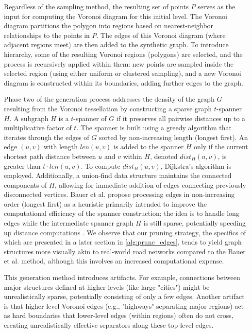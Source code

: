 Regardless of the sampling method, the resulting set of points \(P\) serves as the input for computing the Voronoi diagram for this initial level.
The Voronoi diagram partitions the polygon into regions based on nearest-neighbor relationships to the points in \(P\).
The edges of this Voronoi diagram (where adjacent regions meet) are then added to the synthetic graph.
To introduce hierarchy, some of the resulting Voronoi regions (polygons) are selected, and the process is recursively applied within them: new points are sampled inside the selected region (using either uniform or clustered sampling), and a new Voronoi diagram is constructed within its boundaries, adding further edges to the graph.

Phase two of the generation process addresses the density of the graph \(G\) resulting from the Voronoi tessellation by constructing a sparse graph \(t\)-spanner \(H\).
A subgraph \(H\) is a \(t\)-spanner of \(G\) if it preserves all pairwise distances up to a multiplicative factor of \(t\).
The spanner is built using a greedy algorithm that iterates through the edges of \(G\) sorted by non-increasing length (longest first).
An edge \((u, v)\) with length \(len(u, v)\) is added to the spanner \(H\) only if the current shortest path distance between \(u\) and \(v\) within \(H\), denoted \(dist_H(u, v)\), is greater than \(t \cdot len(u, v)\).
To compute \(dist_H(u, v)\), Dijkstra's algorithm is employed.
Additionally, a union-find data structure maintains the connected components of \(H\), allowing for immediate addition of edges connecting previously disconnected vertices.
Bauer et al. propose processing edges in non-increasing order (longest first) as a heuristic primarily intended to improve the computational efficiency of the spanner construction; the idea is to handle long edges while the intermediate spanner graph \(H\) is still sparse, potentially speeding up distance computations \cite{hutchison_synthetic_2010}.
We observe that our pruning strategy, the specifics of which are presented in a later section in \cref{alg:prune_edges}, tends to yield graph structures more visually akin to real-world road networks compared to the Bauer et al. method, although this involves an increased computational expense.

This generation method introduces artifacts.
For example, connections between major structures defined at higher levels (like large "cities") might be unrealistically sparse, potentially consisting of only a few edges.
Another artifact is that higher-level Voronoi edges (e.g., "highways" separating major regions) act as hard boundaries that lower-level edges (within regions) often do not cross, creating unrealistically effective separators along these top-level edges.

